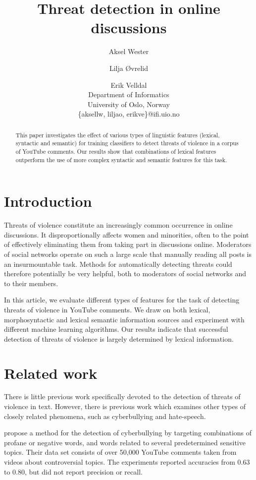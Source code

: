 \documentclass[11pt,letterpaper]{article}
\title{Threat detection in online discussions}
\author{Aksel Wester \and Lilja Øvrelid \and Erik Velldal \\
  Department of Informatics \\
  University of Oslo, Norway \\
  \{aksellw, liljao, erikve\}@ifi.uio.no}
\date{}
\begin{document}
\maketitle

\begin{abstract}
This paper investigates the effect of various types of linguistic features (lexical, syntactic and semantic) for training classifiers to detect threats of violence in a corpus of YouTube comments. %
Our results show that combinations of lexical features outperform the use of more complex syntactic and semantic features for this task.
\end{abstract}

\section{Introduction}
\label{sec:intro}
Threats of violence constitute an increasingly common occurrence in online discussions. It disproportionally affects women and minorities, often to the point of effectively eliminating them from taking part in discussions online. Moderators of social networks operate on such a large scale that manually reading all posts is an insurmountable task. Methods for automatically detecting threats could therefore potentially be very helpful, both to moderators of social networks and to their members.

In this article, we evaluate different types of features for the task of detecting threats of violence in YouTube comments. We draw on both lexical, morphosyntactic and lexical semantic information sources and experiment with different machine learning algorithms. Our results indicate that successful detection of threats of violence is largely determined by lexical information.

\section{Related work}
\label{sec:prev}
There is little previous work specifically devoted to the detection of threats of violence in text. However, there is previous work which examines other types of closely related phenomena, such as cyberbullying and hate-speech.

 propose a method for the detection of cyberbullying by targeting combinations of profane or negative words, and words related to several predetermined sensitive topics. Their data set consists of over 50,000 YouTube comments taken from videos about controversial topics. %
The experiments reported accuracies from 0.63 to 0.80, but did not report precision or recall.
\end{document}

